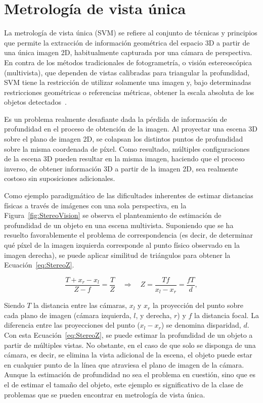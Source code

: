 \section{Metrología de vista única}\label{sec:SVM}
La metrología de vista única (SVM) se refiere al conjunto de técnicas y principios que permite la extracción
de información geométrica del espacio 3D a partir de una única imagen 2D, habitualmente capturada por una
cámara de perspectiva. En contra de los métodos tradicionales de fotogrametría, o visión estereoscópica (multivista), que
dependen de vistas calibradas para triangular la profundidad, SVM tiene la restricción de utilizar solamente
una imagen y, bajo determinadas restricciones geométricas o referencias métricas, obtener la escala absoluta de los objetos detectados~\cite{SVMIW}.
\par
Es un problema realmente desafiante dada la pérdida de información de profundidad en el proceso de obtención
de la imagen. Al proyectar una escena 3D sobre el plano de imagen 2D, se colapsan los distintos puntos de
profundidad sobre la misma coordenada de píxel. Como resultado, múltiples configuraciones de la escena 3D
pueden resultar en la misma imagen, haciendo que el proceso inverso, de obtener información 3D a partir de
la imagen 2D, sea realmente costoso sin suposiciones adicionales.
\par
Como ejemplo paradigmático de las dificultades inherentes de estimar distancias físicas a través
de imágenes con una sola perspectiva, en la Figura~\ref{fig:StereoVision}
se observa el planteamiento de estimación de profundidad de un objeto
en una escena multivista. Suponiendo que se ha resuelto favorablemente el problema de correspondencia (es decir, de
determinar qué píxel de la imagen izquierda corresponde al punto físico observado en la imagen derecha), se
puede aplicar similitud de triángulos para obtener la Ecuación~\ref{eq:StereoZ}.

\begin{equation}\label{eq:StereoZ}
  \frac{T+x_r-x_l}{Z-f}=\frac{T}{Z}
  \quad\Longrightarrow\quad
  Z=\frac{Tf}{x_l-x_r}
  =\frac{fT}{d},
\end{equation}

Siendo $T$ la distancia entre las cámaras, $x_l$ y $x_r$ la proyección del punto sobre cada plano de
imagen (cámara izquierda, $l$, y derecha, $r$) y $f$ la distancia focal. La diferencia entre las
proyecciones del punto ($x_l - x_r$) se denomina disparidad, $d$.
Con esta Ecuación~\ref{eq:StereoZ}, se puede estimar la profundidad de un objeto a partir de múltiples vistas.
No obstante, en el caso de que solo se disponga de una cámara, es decir, se elimina la vista
adicional de la escena, el objeto puede estar en cualquier punto de la línea
que atraviesa el plano de imagen de la cámara.
Aunque la estimación de profundidad no sea el problema en cuestión,
sino que es el de estimar el tamaño del objeto, este ejemplo es significativo de la
clase de problemas que se pueden encontrar en metrología de vista única.

